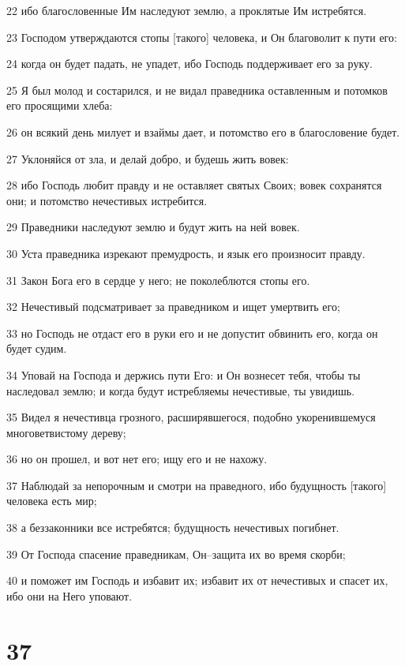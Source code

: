 \par 22 ибо благословенные Им наследуют землю, а проклятые Им истребятся.
\par 23 Господом утверждаются стопы [такого] человека, и Он благоволит к пути его:
\par 24 когда он будет падать, не упадет, ибо Господь поддерживает его за руку.
\par 25 Я был молод и состарился, и не видал праведника оставленным и потомков его просящими хлеба:
\par 26 он всякий день милует и взаймы дает, и потомство его в благословение будет.
\par 27 Уклоняйся от зла, и делай добро, и будешь жить вовек:
\par 28 ибо Господь любит правду и не оставляет святых Своих; вовек сохранятся они; и потомство нечестивых истребится.
\par 29 Праведники наследуют землю и будут жить на ней вовек.
\par 30 Уста праведника изрекают премудрость, и язык его произносит правду.
\par 31 Закон Бога его в сердце у него; не поколеблются стопы его.
\par 32 Нечестивый подсматривает за праведником и ищет умертвить его;
\par 33 но Господь не отдаст его в руки его и не допустит обвинить его, когда он будет судим.
\par 34 Уповай на Господа и держись пути Его: и Он вознесет тебя, чтобы ты наследовал землю; и когда будут истребляемы нечестивые, ты увидишь.
\par 35 Видел я нечестивца грозного, расширявшегося, подобно укоренившемуся многоветвистому дереву;
\par 36 но он прошел, и вот нет его; ищу его и не нахожу.
\par 37 Наблюдай за непорочным и смотри на праведного, ибо будущность [такого] человека есть мир;
\par 38 а беззаконники все истребятся; будущность нечестивых погибнет.
\par 39 От Господа спасение праведникам, Он--защита их во время скорби;
\par 40 и поможет им Господь и избавит их; избавит их от нечестивых и спасет их, ибо они на Него уповают.

\chapter{37}

